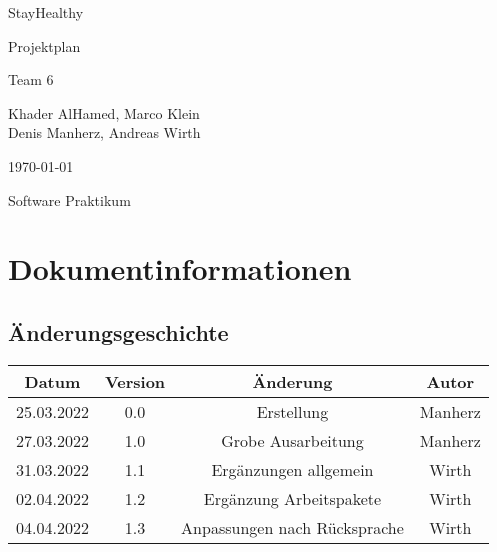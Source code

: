 \documentclass[12pt,a4paper,onecolumn]{article}
\newcommand\titleofdoc{StayHealthy} %
\newcommand\GroupName{Team 6} %
\begin{document}
\begin{titlepage}
   \begin{center}
        \vspace*{4cm} %

        \Huge{\titleofdoc} 

        \vspace{0.5cm}
        \LARGE{Projektplan}
            
        \vspace{3 cm}
        \Large{\GroupName}
       
        \vspace{0.25cm}
        \large{Khader AlHamed, Marco Klein\\Denis Manherz, Andreas Wirth}
       
        \vspace{3 cm}
        \Large{\today}%
        
        \vspace{0.25 cm}
        \Large{Software Praktikum}
       

       \vfill
    \end{center}
\end{titlepage}
\setcounter{page}{2}
\tableofcontents
\newpage

\section{Dokumentinformationen} 
\subsection{Änderungsgeschichte}
\begin{center}
\begin{tabular}{ |c|c|c|c| } 
 \hline
 Datum & Version & Änderung & Autor\\ 
 \hline
 25.03.2022 & 0.0 & Erstellung & Manherz \\ 
 \hline
 27.03.2022 & 1.0 & Grobe Ausarbeitung & Manherz\\
 \hline
 31.03.2022 & 1.1 & Ergänzungen allgemein & Wirth\\
 \hline
 02.04.2022 & 1.2 & Ergänzung Arbeitspakete & Wirth\\
 \hline
 04.04.2022 & 1.3 & Anpassungen nach Rücksprache & Wirth\\
 \hline
\end{tabular}
\end{center}
\end{document}
